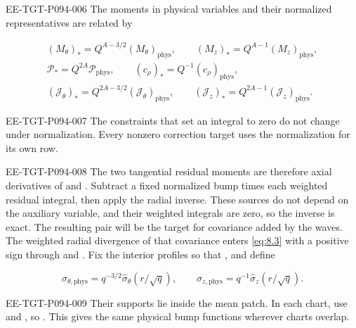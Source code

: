 \begin{EESegment}{EE-TGT-P094-006}
The moments in physical variables and their normalized representatives are related by
\end{EESegment}
\begin{equation}
\begin{gathered}
(M_\theta)_*=Q^{A-3/2}(M_\theta)_{\mathrm{phys}},
\qquad (M_z)_*=Q^{A-1}(M_z)_{\mathrm{phys}},\\
\mathcal P_*=Q^{2A}\mathcal P_{\mathrm{phys}},
\qquad (c_\rho)_*=Q^{-1}(c_\rho)_{\mathrm{phys}},\\
(\mathcal J_\theta)_*=Q^{2A-3/2}(\mathcal J_\theta)_{\mathrm{phys}},
\qquad (\mathcal J_z)_*=Q^{2A-1}(\mathcal J_z)_{\mathrm{phys}}.
\end{gathered}
\tag{8.17}\label{eq:8.17}
\end{equation}
\begin{EESegment}{EE-TGT-P094-007}
The constraints that set an integral to zero do not change under normalization. Every nonzero
correction target uses the normalization for its own row.
\end{EESegment}

\begin{EESegment}{EE-TGT-P094-008}
The two tangential residual moments are therefore axial derivatives of
 and
. Subtract a fixed normalized bump times each
weighted residual integral, then apply the radial inverse. These sources do not depend on the
auxiliary variable, and their weighted integrals are zero, so the inverse is exact. The resulting pair
will be the target for covariance added by the waves. The weighted radial divergence of that
covariance enters \eqref{eq:8.3} with a positive sign through
 and . Fix the interior profiles
 so that
, and define
\end{EESegment}
\[
\sigma_{\theta,\mathrm{phys}}=q^{-3/2}\widehat\sigma_\theta(r/\sqrt q),
\qquad
\sigma_{z,\mathrm{phys}}=q^{-1}\widehat\sigma_z(r/\sqrt q).
\]
\begin{EESegment}{EE-TGT-P094-009}
Their supports lie inside the mean patch. In each chart, use
 and
, so
. This gives the same
physical bump functions wherever charts overlap.
\end{EESegment}

